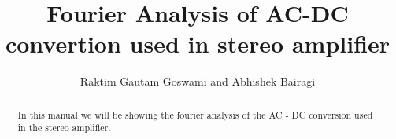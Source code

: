 \documentclass[journal,12pt,twocolumn]{IEEEtran}
\begin{document}
\let\StandardTheFigure\thefigure
\renewcommand{\thefigure}{\theproblem}



\makeatletter
{}
\makeatother

\let\StandardTheFigure\thefigure
\let\StandardTheTable\thetable





\def\putbox#1#2#3{\makebox[0in][l]{\makebox[#1][l]{}\raisebox{\baselineskip}[0in][0in]{\raisebox{#2}[0in][0in]{#3}}}}
     \def\rightbox#1{\makebox[0in][r]{#1}}
     \def\centbox#1{\makebox[0in]{#1}}
     \def\topbox#1{\raisebox{-\baselineskip}[0in][0in]{#1}}
     \def\midbox#1{\raisebox{-0.5\baselineskip}[0in][0in]{#1}}

\vspace{3cm}

\title{ 
	{
Fourier Analysis of AC-DC convertion used in stereo amplifier
	}
}

\author{Raktim Gautam Goswami and Abhishek Bairagi%
	
	
}	

\maketitle



\begin{abstract}
	
	In this manual we will be showing the fourier analysis of the AC - DC conversion used in the stereo amplifier.
	
\end{abstract}

\end{document}
